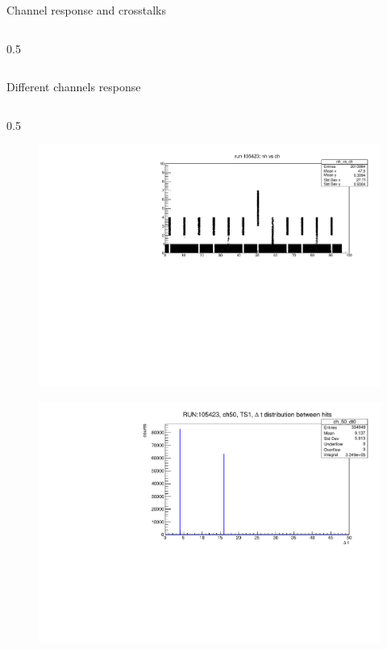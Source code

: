 \documentclass{beamer}[10pt]
\begin{document}
\begin{frame}{Channel response and crosstalks}
\begin{columns}
\begin{column}{0.5\framewidth}
\begin{figure}[H]
   \label{fig:wffytl}
 \end{figure}
\end{column}
\end{columns}

\end{frame}

\begin{frame}{Different channels response}
\vspace{-4mm}
\begin{columns}
\begin{column}{0.5\framewidth}
\begin{figure}[H]
   \centering
   \includegraphics[width= 1.0\columnwidth]{figures/pdf/nhitsvsch_105423.pdf}
   \label{fig:wfgkgnvjkhl}
 \end{figure}
\begin{figure}[H]
   \centering
   \includegraphics[width= 1.0\columnwidth]{figures/pdf/deltatt.pdf}

\end{figure}
\end{column}
\end{columns}
\end{frame}
\end{document}
